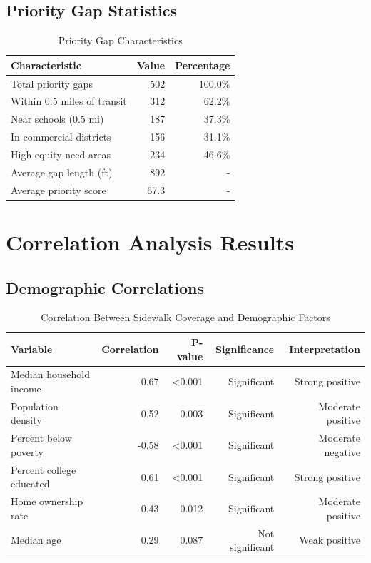 \documentclass[11pt,letterpaper]{article}
\begin{document}
\subsection{Priority Gap Statistics}

\begin{table}[h]
\centering
\caption{Priority Gap Characteristics}
\begin{tabular}{lrr}
\toprule
\textbf{Characteristic} & \textbf{Value} & \textbf{Percentage} \\
\midrule
Total priority gaps & 502 & 100.0\% \\
Within 0.5 miles of transit & 312 & 62.2\% \\
Near schools (0.5 mi) & 187 & 37.3\% \\
In commercial districts & 156 & 31.1\% \\
High equity need areas & 234 & 46.6\% \\
Average gap length (ft) & 892 & - \\
Average priority score & 67.3 & - \\
\bottomrule
\end{tabular}
\end{table}

\section{Correlation Analysis Results}

\subsection{Demographic Correlations}

\begin{table}[h]
\centering
\caption{Correlation Between Sidewalk Coverage and Demographic Factors}
\begin{tabular}{lrrrr}
\toprule
\textbf{Variable} & \textbf{Correlation} & \textbf{P-value} & \textbf{Significance} & \textbf{Interpretation} \\
\midrule
Median household income & 0.67 & <0.001 & Significant & Strong positive \\
Population density & 0.52 & 0.003 & Significant & Moderate positive \\
Percent below poverty & -0.58 & <0.001 & Significant & Moderate negative \\
Percent college educated & 0.61 & <0.001 & Significant & Strong positive \\
Home ownership rate & 0.43 & 0.012 & Significant & Moderate positive \\
Median age & 0.29 & 0.087 & Not significant & Weak positive \\
\bottomrule
\end{tabular}
\end{table}
\end{document}
